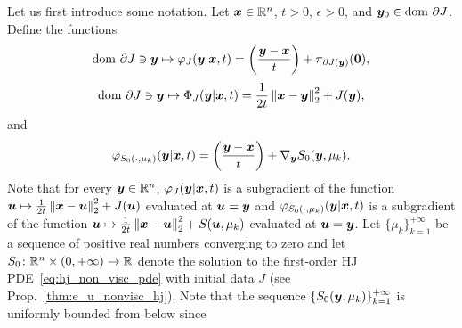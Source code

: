 Let us first introduce some notation. Let $\boldsymbol{x} \in \mathbb{R}^n$, $t>0$, $\epsilon>0$, and $\boldsymbol{y}_0 \in \mathrm{dom~} \partial J$. Define the functions
\begin{equation*}
    \mathrm{dom~}\partial J \ni \boldsymbol{y} \mapsto \varphi_J(\boldsymbol{y}|\boldsymbol{x},t) = \left(\frac{\boldsymbol{y}-\boldsymbol{x}}{t}\right) + \pi_{\partial J(\boldsymbol{y})}(\boldsymbol{0}),
\end{equation*}
\[
\mathrm{dom~}\partial J \ni \boldsymbol{y} \mapsto \Phi_J(\boldsymbol{y}|\boldsymbol{x},t) = \frac{1}{2t}\left\Vert{\boldsymbol{x}-\boldsymbol{y}} \right\Vert_{2}^{2} + J(\boldsymbol{y}),
\]
and
\[
\varphi_{S_0(\cdot,\mu_k)}(\boldsymbol{y}|\boldsymbol{x},t) = \left(\frac{\boldsymbol{y}-\boldsymbol{x}}{t}\right) + \nabla_{\boldsymbol{y}}S_0(\boldsymbol{y},\mu_k).
\]
Note that for every $\boldsymbol{y} \in \mathbb{R}^n$, $\varphi_J(\boldsymbol{y}|\boldsymbol{x},t)$ is a subgradient of the function $\boldsymbol{u} \mapsto \frac{1}{2t}\left\Vert{\boldsymbol{x}-\boldsymbol{u}} \right\Vert_{2}^{2} + J(\boldsymbol{u})$ evaluated at $\boldsymbol{u} = \boldsymbol{y}$ and $\varphi_{S_0(\cdot,\mu_k)}(\boldsymbol{y}|\boldsymbol{x},t)$ is a subgradient of the function $\boldsymbol{u} \mapsto \frac{1}{2t}\left\Vert{\boldsymbol{x}-\boldsymbol{u}} \right\Vert_{2}^{2} + S(\boldsymbol{u},\mu_k)$ evaluated at $\boldsymbol{u} = \boldsymbol{y}$. Let $\{\mu_k\}_{k=1}^{+\infty}$ be a sequence of positive real numbers converging to zero and let $S_0\colon \mathbb{R}^n \times (0,+\infty) \to \mathbb{R}$ denote the solution to the first-order HJ PDE~\eqref{eq:hj_non_visc_pde} with initial data $J$ (see Prop.~\ref{thm:e_u_nonvisc_hj}). Note that the sequence $\{S_0(\boldsymbol{y},\mu_k)\}_{k=1}^{+\infty}$ is uniformly bounded from below since
\beq\label{eq:ubound_appD}
\eeq

